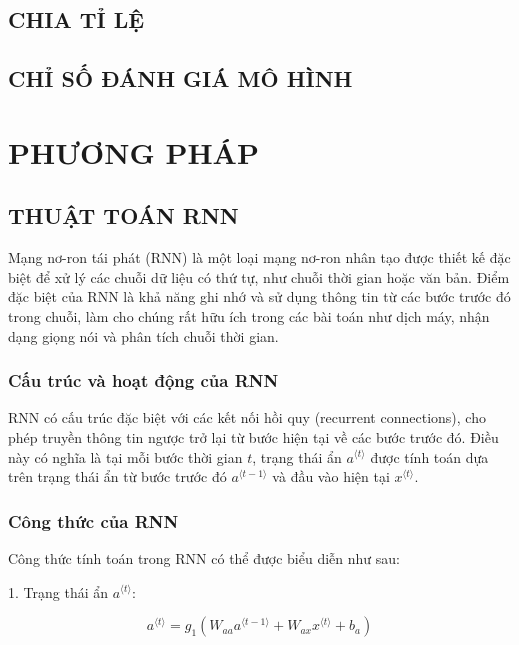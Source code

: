 \documentclass{article}
\begin{document}
\begin{multicols}{2}
\subsection{CHIA TỈ LỆ}



\subsection{CHỈ SỐ ĐÁNH GIÁ MÔ HÌNH}

\section{PHƯƠNG PHÁP}

\subsection{THUẬT TOÁN RNN}

 Mạng nơ-ron tái phát (RNN) là một loại mạng nơ-ron nhân tạo được thiết kế đặc biệt để xử lý các chuỗi dữ liệu có thứ tự, như chuỗi thời gian hoặc văn bản. Điểm đặc biệt của RNN là khả năng ghi nhớ và sử dụng thông tin từ các bước trước đó trong chuỗi, làm cho chúng rất hữu ích trong các bài toán như dịch máy, nhận dạng giọng nói và phân tích chuỗi thời gian.

\subsubsection{Cấu trúc và hoạt động của RNN}

RNN có cấu trúc đặc biệt với các kết nối hồi quy (recurrent connections), cho phép truyền thông tin ngược trở lại từ bước hiện tại về các bước trước đó. Điều này có nghĩa là tại mỗi bước thời gian \(t\), trạng thái ẩn \(a^{\langle t \rangle}\) được tính toán dựa trên trạng thái ẩn từ bước trước đó \(a^{\langle t-1 \rangle}\) và đầu vào hiện tại \(x^{\langle t \rangle}\).

\subsubsection{Công thức của RNN}

Công thức tính toán trong RNN có thể được biểu diễn như sau:

1. Trạng thái ẩn \(a^{\langle t \rangle}\):

\[
a^{\langle t \rangle} = g_1 \left( W_{aa} a^{\langle t-1 \rangle} + W_{ax} x^{\langle t \rangle} + b_a \right)
\]


\end{multicols}
\end{document}
